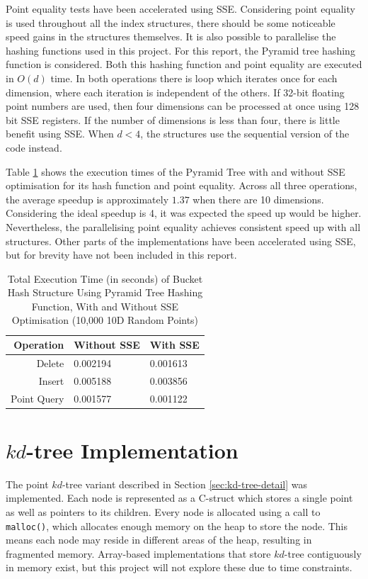 Point equality tests have been accelerated using SSE. Considering point equality is used throughout all the index structures, there should be some noticeable speed gains in the structures themselves. It is also possible to parallelise the hashing functions used in this project. For this report, the Pyramid tree hashing function is considered. Both this hashing function and point equality are executed in $O(d)$ time. In both operations there is loop which iterates once for each dimension, where each iteration is independent of the others. If 32-bit floating point numbers are used, then four dimensions can be processed at once using 128 bit SSE registers. If the number of dimensions is less than four, there is little benefit using SSE. When $d<4$, the structures use the sequential version of the code instead.

Table \ref{tab:pyramid-sse} shows the execution times of the Pyramid Tree with and without SSE optimisation for its hash function and point equality. Across all three operations, the average speedup is approximately $1.37$ when there are 10 dimensions. Considering the ideal speedup is 4, it was expected the speed up would be higher. Nevertheless, the parallelising point equality achieves consistent speed up with all structures. Other parts of the implementations have been accelerated using SSE, but for brevity have not been included in this report.

\begin{table}
	\centering
	\begin{tabular}{|r|l|l|}
		\hline
		\textbf{Operation} & \textbf{Without SSE} & \textbf{With SSE} \\
		\hline
		Delete & 0.002194 & 0.001613 \\
		Insert & 0.005188 & 0.003856 \\
		Point Query & 0.001577 & 0.001122 \\
		\hline
	\end{tabular}
	\caption{Total Execution Time (in seconds) of Bucket Hash Structure Using Pyramid Tree Hashing Function, With and Without SSE Optimisation (10,000 10D Random Points)}
	\label{tab:pyramid-sse}
\end{table}

\section{$kd$-tree Implementation}

The point $kd$-tree variant described in Section \ref{sec:kd-tree-detail} was implemented. Each node is represented as a C-struct which stores a single point as well as pointers to its children. Every node is allocated using a call to \texttt{malloc()}, which allocates enough memory on the heap to store the node. This means each node may reside in different areas of the heap, resulting in fragmented memory. Array-based implementations that store $kd$-tree contiguously in memory exist, but this project will not explore these due to time constraints.